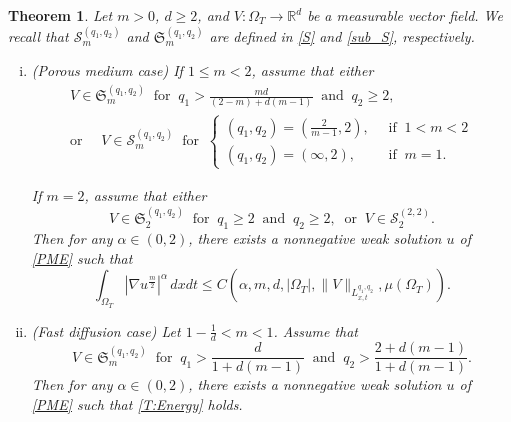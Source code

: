\documentclass{amsart}
\newtheorem{theorem}[defn]{Theorem}
\numberwithin{equation}{section}
\begin{document}
\begin{theorem}\label{T:PME}
Let $m>0$, $d\geq 2$, and $V:\Omega_{T} \to \mathbb{R}^d$ be a measurable vector field. We recall that $\mathcal{S}_{m}^{(q_1,q_2)}$ and $\mathfrak{S}_{m}^{(q_1,q_2)}$ are defined in \eqref{S} and \eqref{sub_S}, respectively.
\begin{enumerate}[(i)] 
  \item (Porous medium case) If $1\leq m < 2$, assume that either
\begin{equation}\label{T:V:PME}
\begin{gathered}
	V \in \mathfrak{S}_{m}^{(q_1, q_2)} \ \text{ for } \
		 q_1 > \frac{md}{(2-m)+d(m-1)} \ \text{ and } \ q_2 \geq 2,	\\
\text{or } \quad V \in \mathcal{S}_{m}^{(q_1,q_2)} \ \text{ for } \ 
\begin{cases}
   (q_1, q_2) = (\frac{2}{m-1}, 2), \ & \text{ if }\ 1<m < 2 \\
  (q_1, q_2) = (\infty, 2), & \text{ if } \ m=1.
\end{cases}
\end{gathered}
\end{equation}

If $m=2$, assume that either
\begin{equation}\label{T:V:PME_2}
	V \in \mathfrak{S}_{2}^{(q_1, q_2)} \ \text{ for } \
		 q_1 \geq 2 \ \text{ and } \ q_2 \geq 2,	
\ \text{ or } \  V \in \mathcal{S}_{2}^{(2,2)}.
\end{equation}
Then for any $\alpha \in (0,2)$, there exists a nonnegative weak solution $u$ of \eqref{PME} such that
\begin{equation}\label{T:Energy}
 \int_{\Omega_{T}} \left|\nabla u^{\frac{m}{2}}\right|^{\alpha} \,dxdt\leq  C\left(\alpha, m, d, |\Omega_T|, \|V\|_{L_{x,t}^{q_1,q_2}}, \mu(\Omega_{T})\right).
\end{equation}
  \item (Fast diffusion case) Let $1-\frac{1}{d} < m <1$. Assume that
\begin{equation}\label{T:V:FDE}
	V \in \mathfrak{S}_{m}^{(q_1, q_2)} \ \text{ for } \ q_1 > \frac{d}{1+d(m-1)} \ \text{ and } \ q_2>\frac{2+d(m-1)}{1+d(m-1)}.
\end{equation}
Then for any $\alpha \in (0,2)$, there exists a nonnegative weak solution $u$ of \eqref{PME} such that \eqref{T:Energy} holds.
\end{enumerate}
\end{theorem}
\end{document}
